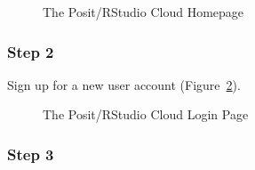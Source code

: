 \documentclass[
  letterpaper,
  DIV=11,
  numbers=noendperiod]{scrreprt}
\begin{document}
\begin{figure}


\caption{\label{fig-r-cloud-1}The Posit/RStudio Cloud Homepage}

\end{figure}%

\subsubsection{Step 2}\label{step-2-1}

Sign up for a new user account (Figure~\ref{fig-r-cloud-2}).

\begin{figure}


\caption{\label{fig-r-cloud-2}The Posit/RStudio Cloud Login Page}

\end{figure}%

\subsubsection{Step 3}\label{step-3-1}
\end{document}
